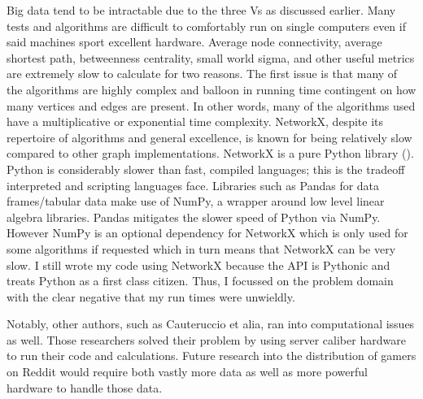 \documentclass[12pt, a4paper]{article}
\begin{document}
Big data tend to be intractable due to the three Vs as discussed earlier. Many tests and algorithms are difficult to comfortably run on single computers even if said machines sport excellent hardware. Average node connectivity, average shortest path, betweenness centrality, small world sigma, and other useful metrics are extremely slow to calculate for two reasons. The first issue is that many of the algorithms are highly complex and balloon in running time contingent on how many vertices and edges are present. In other words, many of the algorithms used have a multiplicative or exponential time complexity. NetworkX, despite its repertoire of algorithms and general excellence, is known for being relatively slow compared to other graph implementations. NetworkX is a pure Python library (\cite{networkx}). Python is considerably slower than fast, compiled languages; this is the tradeoff interpreted and scripting languages face. Libraries such as Pandas for data frames/tabular data make use of NumPy, a wrapper around low level linear algebra libraries. Pandas mitigates the slower speed of Python via NumPy. However NumPy is an optional dependency for NetworkX which is only used for some algorithms if requested which in turn means that NetworkX can be very slow. I still wrote my code using NetworkX because the API is Pythonic and treats Python as a first class citizen. Thus, I focussed on the problem domain with the clear negative that my run times were unwieldly.

Notably, other authors, such as Cauteruccio et alia, ran into computational issues as well. Those researchers solved their problem by using server caliber hardware to run their code and calculations. Future research into the distribution of gamers on Reddit would require both vastly more data as well as more powerful hardware to handle those data.
\end{document}
